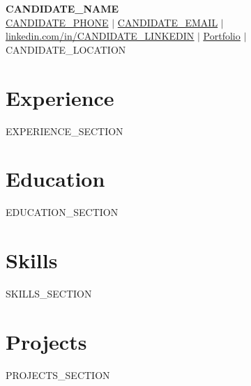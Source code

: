 \documentclass[letterpaper,11pt]{article}
\newcommand{\sectionListStart}{\begin{itemize}[leftmargin=0pt, label={}]}
\newcommand{\sectionListEnd}{\end{itemize}}
\begin{document}
\def\spaceAfterLogo{0.5pt}
\begin{center}
  \textbf{\Huge {{CANDIDATE_NAME}}} \\ \vspace{3pt}
  \small
  \hspace{\spaceAfterLogo} \href{tel:{{CANDIDATE_PHONE}}}{{CANDIDATE_PHONE}}
  $|$
   \hspace{\spaceAfterLogo} \href{mailto:{{CANDIDATE_EMAIL}}}{{CANDIDATE_EMAIL}}
  $|$
   \hspace{\spaceAfterLogo} {\underline{\href{https://www.linkedin.com/in/{{CANDIDATE_LINKEDIN}}}{linkedin.com/in/{{CANDIDATE_LINKEDIN}}}}}
  $|$
  \hspace{\spaceAfterLogo} 
  {\underline{{\href{https://{{CANDIDATE_PORTFOLIO}}/}{Portfolio}}}} 
  $|$
  \hspace{\spaceAfterLogo} {{CANDIDATE_LOCATION}}
\end{center}

\section{Experience}
\sectionListStart
{{EXPERIENCE_SECTION}}
\sectionListEnd

\section{Education}
\sectionListStart
{{EDUCATION_SECTION}}
\sectionListEnd

\section{Skills}
\sectionListStart
{{SKILLS_SECTION}}
\sectionListEnd

\section{Projects}
\sectionListStart
{{PROJECTS_SECTION}}
\sectionListEnd

\end{document}
